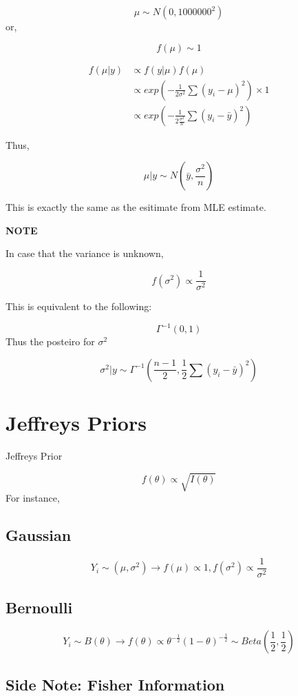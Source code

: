 \documentclass[]{book}
\begin{document}
\[\mu \sim N(0, 1000000^2)\] or,

\[f(\mu) \sim 1\]

\[\begin{aligned} f(\mu | y) &\propto f(y|\mu)f(\mu) \\ &\propto exp(-\frac{1}{2 \sigma^2} \sum (y_i-\mu)^2) \times 1 \\ &\propto exp(-\frac{1}{2 \frac{\sigma^2}{n}} \sum (y_i-\bar{y})^2) \end{aligned}\]

Thus,

\[\mu | y \sim N(\bar{y}, \frac{\sigma^2}{n})\]

This is exactly the same as the esitimate from MLE estimate.

\textbf{NOTE}

In case that the variance is unknown,

\[f(\sigma^2) \propto \frac{1}{\sigma^2}\]

This is equivalent to the following:

\[\Gamma ^{-1}(0,1)\] Thus the posteiro for \(\sigma^2\)

\[\sigma^2|y \sim \Gamma ^{-1} (\frac{n-1}{2},\frac{1}{2} \sum (y_i-\bar{y})^2)\]

\section{Jeffreys Priors}\label{jeffreys-priors}

Jeffreys Prior

\[f(\theta) \propto \sqrt{I(\theta)}\] For instance,

\subsection{Gaussian}\label{gaussian-1}

\[Y_i \sim (\mu, \sigma^2) \rightarrow f(\mu) \propto 1, f(\sigma^2)\propto \frac{1}{\sigma^2}\]

\subsection{Bernoulli}\label{bernoulli-1}

\[Y_i \sim B(\theta) \rightarrow f(\theta) \propto \theta ^{-\frac{1}{2}}(1-\theta)^{-\frac{1}{2}}\sim Beta(\frac{1}{2},\frac{1}{2})\]

\subsection{Side Note: Fisher
Information}\label{side-note-fisher-information}
\end{document}
